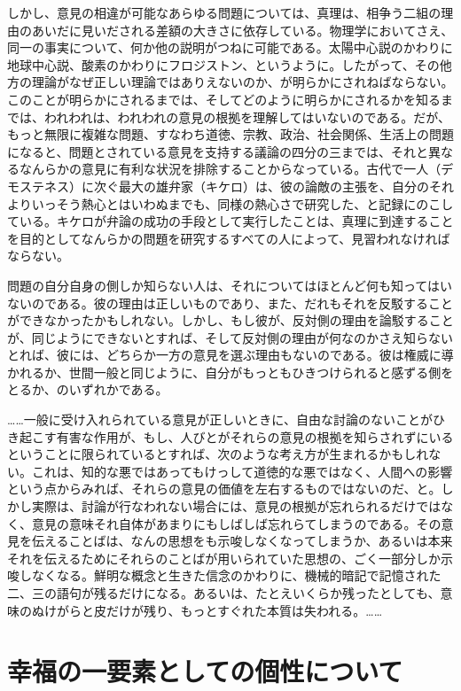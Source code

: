 しかし、意見の相違が可能なあらゆる問題については、真理は、相争う二組の理由のあいだに見いだされる差額の大きさに依存している。物理学においてさえ、同一の事実について、何か他の説明がつねに可能である。太陽中心説のかわりに地球中心説、酸素のかわりにフロジストン、というように。したがって、その他方の理論がなぜ正しい理論ではありえないのか、が明らかにされねばならない。このことが明らかにされるまでは、そしてどのように明らかにされるかを知るまでは、われわれは、われわれの意見の根拠を理解してはいないのである。だが、もっと無限に複雑な問題、すなわち道徳、宗教、政治、社会関係、生活上の問題になると、問題とされている意見を支持する議論の四分の三までは、それと異なるなんらかの意見に有利な状況を排除することからなっている。古代で一人（デモステネス）に次ぐ最大の雄弁家（キケロ）は、彼の論敵の主張を、自分のそれよりいっそう熱心とはいわぬまでも、同様の熱心さで研究した、と記録にのこしている。キケロが弁論の成功の手段として実行したことは、真理に到達することを目的としてなんらかの問題を研究するすべての人によって、見習われなければならない。

問題の自分自身の側しか知らない人は、それについてはほとんど何も知ってはいないのである。彼の理由は正しいものであり、また、だれもそれを反駁することができなかったかもしれない。しかし、もし彼が、反対側の理由を論駁することが、同じようにできないとすれば、そして反対側の理由が何なのかさえ知らないとれば、彼には、どちらか一方の意見を選ぶ理由もないのである。彼は権威に導かれるか、世間一般と同じように、自分がもっともひきつけられると感ずる側をとるか、のいずれかである。

\vspace{1zw}

……一般に受け入れられている意見が正しいときに、自由な討論のないことがひき起こす有害な作用が、もし、人びとがそれらの意見の根拠を知らされずにいるということに限られているとすれば、次のような考え方が生まれるかもしれない。これは、知的な悪ではあってもけっして道徳的な悪ではなく、人間への影響という点からみれば、それらの意見の価値を左右するものではないのだ、と。しかし実際は、討論が行なわれない場合には、意見の根拠が忘れられるだけではなく、意見の意味それ自体があまりにもしばしば忘れらてしまうのである。その意見を伝えることばは、なんの思想をも示唆しなくなってしまうか、あるいは本来それを伝えるためにそれらのことばが用いられていた思想の、ごく一部分しか示唆しなくなる。鮮明な概念と生きた信念のかわりに、機械的暗記で記憶された二、三の語句が残るだけになる。あるいは、たとえいくらか残ったとしても、意味のぬけがらと皮だけが残り、もっとすぐれた本質は失われる。……

\section*{幸福の一要素としての個性について}


